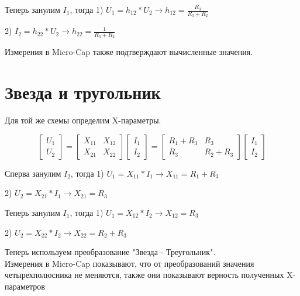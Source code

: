 \documentclass[a4paper]{article}
\begin{document}
Теперь занулим $I_1$, тогда 1) $U_1 = h_{12} * U_2 \longrightarrow h_{12} = \frac{R_3}{R_3 + R_2}$

\hspace{4.05cm} 2) $I_2 = h_{22} * U_2 \longrightarrow h_{22} = \frac{1}{R_3 + R_2}$

Измерения в Micro-Cap также подтверждают вычисленные значения.

\newpage

\section{Звезда и тругольник}

Для той же схемы определим X-параметры.

\[
\begin{bmatrix}
    U_1\\
    U_2
\end{bmatrix}
 =
\begin{bmatrix}
    X_{11} & X_{12}\\
    X_{21} & X_{22}
\end{bmatrix}
\begin{bmatrix}
    I_1\\
    I_2
\end{bmatrix}
 =
\begin{bmatrix}
    R_1 + R_3 & R_3       \\
    R_3       & R_2 + R_3
\end{bmatrix}
\begin{bmatrix}
    I_1\\
    I_2
\end{bmatrix}
\]

Сперва занулим $I_2$, тогда 1) $U_1 = X_{11} * I_1 \longrightarrow X_{11} = R_1 + R_3$

\hspace{4.10cm}             2) $U_2 = X_{21} * I_1 \longrightarrow X_{21} = R_3$
\vspace{0.3cm}

Теперь занулим $I_1$, тогда 1) $U_1 = X_{12} * I_2 \longrightarrow X_{12} = R_3$

\hspace{4.05cm}             2) $U_2 = X_{22} * I_2 \longrightarrow X_{22} = R_2 + R_3$
\vspace{0.3cm}

Теперь используем преобразование "Звезда - Треугольник".
\\
Измерения в Micro-Cap показывают, что от преобразований значения четырехполюсника не меняются,
также они показывают верность полученных X-параметров
\end{document}
